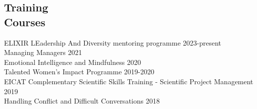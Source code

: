\documentclass[margin,line]{res}
\begin{document}
\begin{resume}



\section{\sc Training\\ Courses}

ELIXIR LEadership And Diversity mentoring programme \hfill {2023-present}\\
Managing Managers \hfill {2021}\\
Emotional Intelligence and Mindfulness \hfill {2020}\\
Talented Women's Impact Programme \hfill {2019-2020}\\
EICAT Complementary Scientific Skills Training - Scientific Project Management \hfill {2019}\\
Handling Conflict and Difficult Conversations \hfill {2018}

\end{resume}
\end{document}

